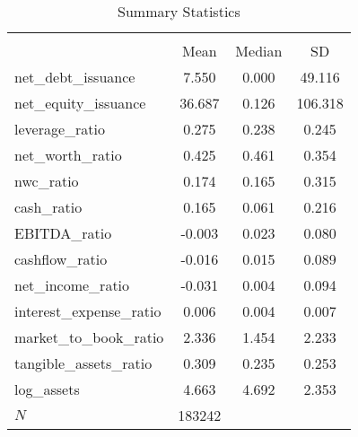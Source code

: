 \begin{table}[htbp]\centering
\def\sym#1{\ifmmode^{#1}\else\(^{#1}\)\fi}
\caption{Summary Statistics}
\begin{tabular}{l*{1}{ccc}}
\toprule
            &\multicolumn{3}{c}{}                  \\
            &        Mean&      Median&          SD\\
\midrule
net\_debt\_issuance&       7.550&       0.000&      49.116\\
net\_equity\_issuance&      36.687&       0.126&     106.318\\
leverage\_ratio&       0.275&       0.238&       0.245\\
net\_worth\_ratio&       0.425&       0.461&       0.354\\
nwc\_ratio   &       0.174&       0.165&       0.315\\
cash\_ratio  &       0.165&       0.061&       0.216\\
EBITDA\_ratio&      -0.003&       0.023&       0.080\\
cashflow\_ratio&      -0.016&       0.015&       0.089\\
net\_income\_ratio&      -0.031&       0.004&       0.094\\
interest\_expense\_ratio&       0.006&       0.004&       0.007\\
market\_to\_book\_ratio&       2.336&       1.454&       2.233\\
tangible\_assets\_ratio&       0.309&       0.235&       0.253\\
log\_assets  &       4.663&       4.692&       2.353\\
\midrule
\(N\)       &      183242&            &            \\
\bottomrule
\end{tabular}
\end{table}

